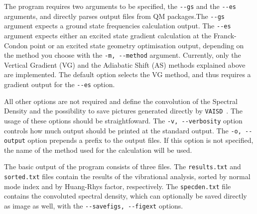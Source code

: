 \documentclass[a4paper]{article}
\newcommand{\vaisd}{\texttt{VAISD}}
\begin{document}
The program requires two arguments to be specified, the \verb|--gs| and the \verb|--es| arguments, and directly parses output files from QM packages.\footnotemark The \verb|--gs| argument expects a ground state frequencies calculation output. The \verb|--es| argument expects either an excited state gradient calculation at the Franck-Condon point or an excited state geometry optimisation output, depending on the method you choose with the \verb|-m, --method| argument. Currently, only the Vertical Gradient (VG) and the Adiabatic Shift (AS) methods explained above are implemented. The default option selects the VG method, and thus requires a gradient output for the \verb|--es| option.

All other options are not required and define the convolution of the Spectral Density and the possibility to save pictures generated directly by \vaisd\ . The usage of these options should be straightfoward. The \verb|-v, --verbosity| option controls how much output should be printed at the standard output. The \verb|-o, --output| option prepends a prefix to the output files. If this option is not specified, the name of the method used for the calculation will be used.

The basic output of the program consists of three files. The \verb|results.txt| and \verb|sorted.txt| files contain the results of the vibrational analysis, sorted by normal mode index and by Huang-Rhys factor, respectively. The \verb|specden.txt| file contains the convoluted spectral density, which can optionally be saved directly as image as well, with the \verb|--savefigs, --figext| options.



\end{document}
